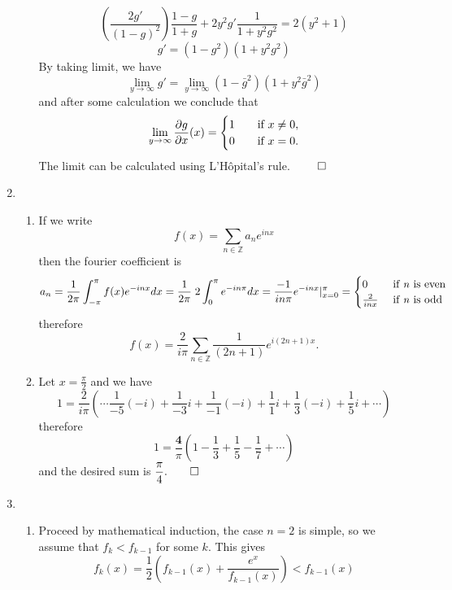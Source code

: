\begin{enumerate}
\begin{enumerate}
        \[
        \left( \frac{2g'}{(1-g)^2} \right) \frac{1-g}{1+g} + 2y^2g' \frac{1}{1+y^2g^2} = 2(y^2+1)
        \]
        \[
        g' = \left(1-g^2\right)\left(1+y^2g^2\right)
        \]
        By taking limit, we have
        \[
        \lim_{y\to \infty} g' = \lim_{y \to \infty} (1-\bar{g}^2)(1+y^2\bar{g}^2)
        \]
        and after some calculation we conclude that
        \[
        \lim_{y\to \infty} \frac{\partial g}{\partial x}(x) = 
        \begin{cases}
        1 &\text{\quad if } x \neq 0, \\
        0 &\text{\quad if } x = 0. \\
        \end{cases}
        \]
        The limit can be calculated using L'Hôpital's rule. $\qed$
    \end{enumerate}
    \item 
    \begin{enumerate}
        \item If we write
        \[
        f(x) = \sum_{n \in \mathbb{Z}} a_n e^{inx}
        \]
        then the fourier coefficient is
        \[
        a_n = \frac{1}{2\pi} \int_{-\pi}^\pi f(x) e^{-inx} dx = \frac{1}{2\pi} \; 2 \int_0^\pi e^{-in\pi} dx = \frac{-1}{in\pi} e^{-inx}\vert^\pi_{x = 0} = 
        \begin{cases}
        0 &\text{ if \emph{n} is even}  \\
        \frac{2}{inx} &\text{ if \emph{n} is odd}
        \end{cases}
        \]
        therefore
        \[
        f(x) = \frac{2}{i\pi} \sum_{n \in \mathbb{Z}} \frac{1}{(2n+1)} e^{i(2n+1)x}.
        \]
        \item Let $x = \frac{\pi}{2}$ and we have
        \[
        1 = \frac{2}{i\pi} \left(\cdots \frac{1}{-5}(-i) + \frac{1}{-3}i + \frac{1}{-1}(-i) + \frac{1}{1}i + \frac{1}{3}(-i) + \frac{1}{5}i + \cdots\right)
        \]
        therefore
        \[
        1 = \frac{\textbf{4}}{\pi}\left( 1 - \frac{1}{3} + \frac{1}{5} - \frac{1}{7} + \cdots \right)
        \]
        and the desired sum is $\dfrac{\pi}{4}. \qed$
    \end{enumerate}
    \item
    \begin{enumerate}
        \item Proceed by mathematical induction, the case $n = 2$ is simple, so we assume that $f_k < f_{k-1}$ for some $k$. This gives
        \[
        f_{k}(x) = \dfrac{1}{2}\left(f_{k-1}(x) + \dfrac{e^x}{f_{k-1}(x)}\right) < f_{k-1}(x)
\]
\end{enumerate}
\end{enumerate}
